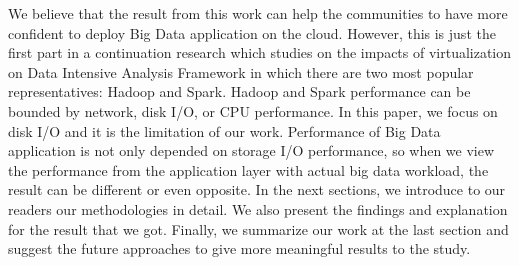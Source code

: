 \documentclass{acmsig}
\begin{document}
We believe that the result from this work can help the communities to have more confident to deploy Big Data application on the cloud. However, this is just the first part in a continuation research which studies on the impacts of virtualization on Data Intensive Analysis Framework in which there are two most popular representatives: Hadoop and Spark. Hadoop and Spark performance can be bounded by network, disk I/O, or CPU performance. In this paper, we focus on disk I/O and it is the limitation of our work. Performance of Big Data application is not only depended on storage I/O performance, so when we view the performance from the application layer with actual big data workload, the result can be different or even opposite. In the next sections, we introduce to our readers our methodologies in detail. We also present the findings and explanation for the result that we got. Finally, we summarize our work at the last section and suggest the future approaches to give more meaningful results to the study.

\end{document}
